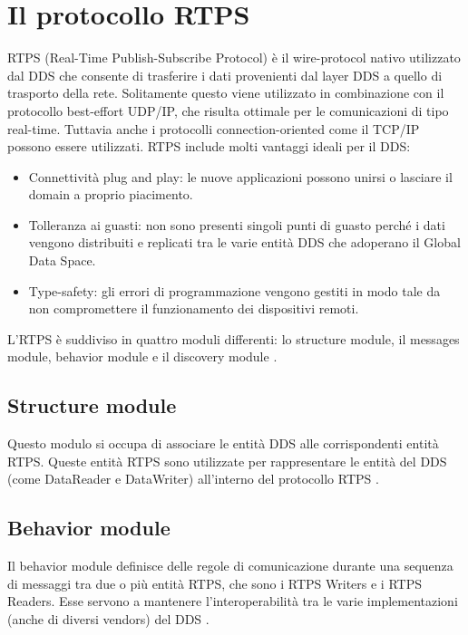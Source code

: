 \section{Il protocollo RTPS}
RTPS (Real-Time Publish-Subscribe Protocol) è il wire-protocol 
nativo utilizzato dal DDS che consente di trasferire i dati provenienti
dal layer DDS a quello di trasporto della rete.
Solitamente questo viene utilizzato in combinazione con il protocollo
best-effort
UDP/IP, che risulta ottimale per le comunicazioni di tipo real-time. Tuttavia 
anche i protocolli connection-oriented come il TCP/IP possono essere utilizzati. 
RTPS include molti vantaggi ideali per il DDS:
\begin{itemize}
    \item Connettività plug and play: le nuove applicazioni possono unirsi o 
    lasciare il domain a proprio piacimento.
    \item Tolleranza ai guasti: non sono presenti singoli punti di 
    guasto perché i dati vengono distribuiti e replicati tra le varie 
    entità DDS che adoperano il Global Data Space.
    \item Type-safety: gli errori di programmazione vengono gestiti 
    in modo tale da non compromettere il funzionamento 
    dei dispositivi remoti.
\end{itemize}
L'RTPS è suddiviso in quattro moduli differenti: lo structure module, il 
messages module, behavior module e il discovery module \cite{ddsrtps}.

\subsection{Structure module}
Questo modulo si occupa di associare le entità DDS alle corrispondenti
entità RTPS. Queste entità RTPS sono utilizzate 
per rappresentare le entità del DDS (come DataReader e DataWriter) 
all'interno del protocollo RTPS \cite{ddsrtps}.

\subsection{Behavior module}
Il behavior module definisce delle regole di comunicazione durante 
una sequenza di messaggi tra
due o più entità RTPS, che sono i RTPS Writers e i RTPS Readers.
Esse servono a mantenere l'interoperabilità tra le varie 
implementazioni (anche di diversi vendors) del DDS \cite{ddsrtps}.

